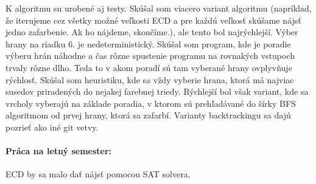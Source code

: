 \documentclass[11pt]{article}
\begin{document}
K algoritmu su urobené aj testy. Skúšal som viacero variant algoritmu (napríklad, že 
iterujeme cez všetky možné veľkosti ECD a pre každú veľkosť skúšame nájsť jedno zafarbenie.
Ak ho nájdeme, skončíme.), ale tento bol najrýchlejší. Výber hrany na riadku 6. je 
nedeterministický. Skúšal som program, kde je poradie výberu hrán náhodne a čas rôzne spustenie
programu na rovnakých vstupoch trvaly rôzne dlho. Teda to v akom poradí sú tam vyberané 
hrany ovplyvňuje rýchlosť. Skúšal som heuristiku, kde sa vždy vyberie hrana, ktorá má najviac
susedov priradených do nejakej farebnej triedy. Rýchlejší bol však variant, kde sa vrcholy vyberajú
na základe poradia, v ktorom sú prehľadávané do šírky BFS algoritmom od prvej hrany, ktorá sa zafarbí.
Varianty backtrackingu sa dajú pozrieť ako iné git vetvy. 

\paragraph{Práca na letný semester:} ECD by sa malo dať nájsť pomocou SAT solvera.
\printbibliography
\end{document}
